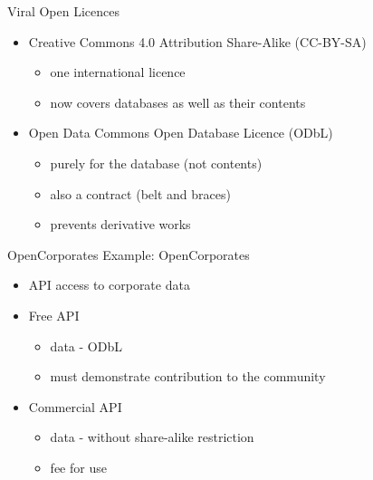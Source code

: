 \documentclass{beamer}
\begin{document}
\begin{frame}{Viral Open Licences}
  \begin{itemize}
  \item Creative Commons 4.0 Attribution Share-Alike (CC-BY-SA)
    \begin{itemize}
    \item one international licence
    \item now covers databases as well as their contents
    \end{itemize}
  \item Open Data Commons Open Database Licence (ODbL)
    \begin{itemize}
    \item purely for the database (not contents)
    \item also a contract (belt and braces)
    \item prevents derivative works
    \end{itemize}
  \end{itemize}
\end{frame}

\begin{frame}{OpenCorporates}
Example: OpenCorporates
\begin{itemize}
\item API access to corporate data
\item Free API
  \begin{itemize}
  \item data - ODbL
  \item must demonstrate contribution to the community
  \end{itemize}
\item Commercial API
  \begin{itemize}
  \item data - without share-alike restriction
  \item fee for use
  \end{itemize}
\end{itemize}
\end{frame}
\end{document}
